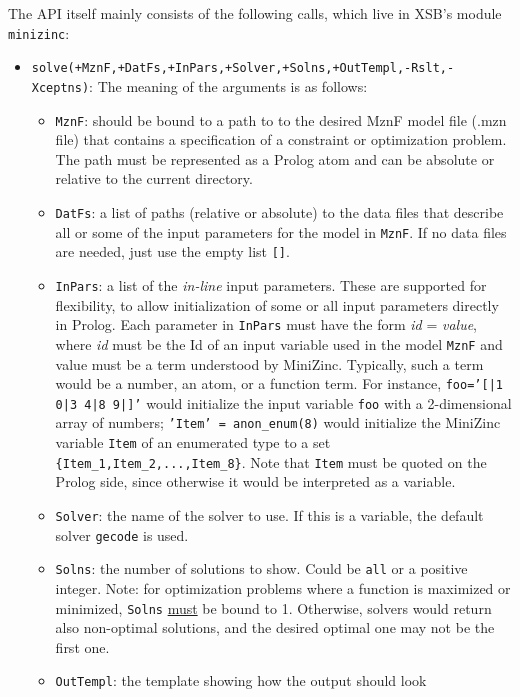 The API itself mainly consists of the following calls, which live in XSB's
module \texttt{minizinc}: 
\begin{itemize}
\item
  \texttt{solve(+MznF,+DatFs,+InPars,+Solver,+Solns,+OutTempl,-Rslt,-Xceptns)}: 
  The meaning of the arguments is as follows:
  \begin{itemize}
  \item    \texttt{MznF}: should be bound to a path to to the desired MznF
    model file (.mzn file) that contains a specification of a constraint or
    optimization problem. The path must be represented as a Prolog atom and
    can be absolute or relative to the current directory.
  \item \texttt{DatFs}: a list of paths (relative or absolute)  
    to the data files that describe all or some of the input parameters for
    the model in \texttt{MznF}.
    If no data files are needed, just use the empty list \texttt{[]}. 
  \item \texttt{InPars}: a list of the \emph{in-line} input parameters.
    These are supported for flexibility, to allow initialization of some or
    all input parameters directly in Prolog.
    Each parameter in \texttt{InPars} must have the form \emph{id} =
    \emph{value}, where \emph{id} must be the Id of an input variable used in
    the model \texttt{MznF} and value must be a term understood by MiniZinc.
    Typically, such a term would be a number, an atom, or a function term.
    For instance,  \texttt{foo='[|1 0|3 4|8 9|]'} would initialize the input
    variable \texttt{foo} with a 2-dimensional array of numbers;
    \texttt{'Item' = anon\_enum(8)}  would initialize the MiniZinc variable
    \texttt{Item}  of an enumerated type to a set
    \texttt{\{Item\_1,Item\_2,...,Item\_8\}}.  Note that \texttt{Item} must
    be quoted on the Prolog side, since otherwise it would be interpreted
    as a variable.
  \item \texttt{Solver}: the name of the solver to use. If this is a variable,
    the default solver \texttt{gecode} is used. 
  \item \texttt{Solns}: the number of solutions to show. 
    Could be \texttt{all} or a positive integer.
    Note: for optimization problems where a function is maximized or minimized,
    \texttt{Solns} \underline{must} be bound to 1. Otherwise, solvers would
    return also non-optimal solutions, and the desired optimal one may not
    be the first one.
  \item \texttt{OutTempl}: the template showing how the output should look

\end{itemize}
\end{itemize}
